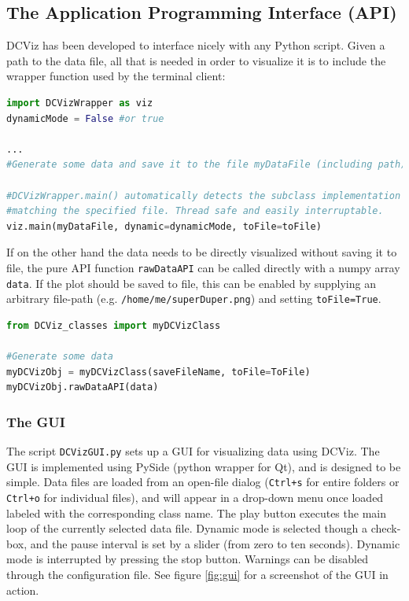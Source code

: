 \subsection{The Application Programming Interface (API)}

DCViz has been developed to interface nicely with any Python script. Given a path to the data file, all that is needed in order to visualize it is to include the wrapper function used by the terminal client:

\vspace{0.5cm}
\begin{lstlisting}[language=Python]
import DCVizWrapper as viz
dynamicMode = False #or true

...
#Generate some data and save it to the file myDataFile (including path)

#DCVizWrapper.main() automatically detects the subclass implementation 
#matching the specified file. Thread safe and easily interruptable.
viz.main(myDataFile, dynamic=dynamicMode, toFile=toFile)
\end{lstlisting}

If on the other hand the data needs to be directly visualized without saving it to file, the pure API function \verb+rawDataAPI+ can be called directly with a numpy array \verb+data+. If the plot should be saved to file, this can be enabled by supplying an arbitrary file-path (e.g. \verb+/home/me/superDuper.png+) and setting \verb+toFile=True+.

\begin{lstlisting}[language=Python]
from DCViz_classes import myDCVizClass

#Generate some data
myDCVizObj = myDCVizClass(saveFileName, toFile=ToFile)
myDCVizObj.rawDataAPI(data)
\end{lstlisting}


\subsubsection{The GUI}

The script \verb+DCVizGUI.py+ sets up a GUI for visualizing data using DCViz. The GUI is implemented using PySide (python wrapper for Qt), and is designed to be simple. Data files are loaded from an open-file dialog (\verb|Ctrl+s| for entire folders or \verb|Ctrl+o| for individual files), and will appear in a drop-down menu once loaded labeled with the corresponding class name. The play button executes the main loop of the currently selected data file. Dynamic mode is selected though a check-box, and the pause interval is set by a slider (from zero to ten seconds). Dynamic mode is interrupted by pressing the stop button. Warnings can be disabled through the configuration file. See figure \ref{fig:gui} for a screenshot of the GUI in action.

